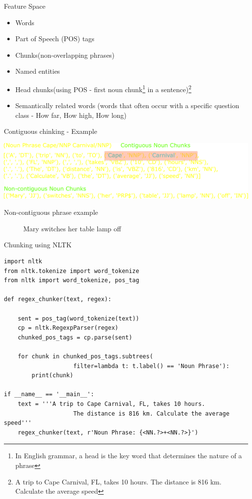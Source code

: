 \begin{frame}[fragile, shrink=10]{Feature Space}
    \begin{multicols}{2}
        \begin{itemize}
            \item Words
            \item Part of Speech (POS) tags
            \item Chunks(non-overlapping phrases)
            \item Named entities
            \item Head  chunks(using POS - first  noun  chunk\footnote{In English grammar, a head is the key word that determines the nature of a phrase}  in  a  sentence)\footnote{A trip to Cape Carnival, FL, takes 10 hours. The distance is 816 km. Calculate the average speed}
            \item Semantically  related  words (words  that often occur with a specific question class - How far, How high, How long)
        \end{itemize}
            \end{multicols}
            Contiguous chinking - Example
             \begin{center}
                \includegraphics[width=0.85\linewidth]{./Images/POS}
            \end{center}
            \begin{description}
                \item[Non-contiguous phrase example] Mary switches her table lamp off
            \end{description}
\end{frame}
\begin{frame}[fragile,shrink=9]{Chunking using NLTK}
\begin{lstlisting}
import nltk
from nltk.tokenize import word_tokenize
from nltk import word_tokenize, pos_tag

def regex_chunker(text, regex):

    sent = pos_tag(word_tokenize(text))
    cp = nltk.RegexpParser(regex)
    chunked_pos_tags = cp.parse(sent)

    for chunk in chunked_pos_tags.subtrees(
                    filter=lambda t: t.label() == 'Noun Phrase'):
        print(chunk)

if __name__ == '__main__':
    text = '''A trip to Cape Carnival, FL, takes 10 hours.
                    The distance is 816 km. Calculate the average speed'''
    regex_chunker(text, r'Noun Phrase: {<NN.?>+<NN.?>}')
\end{lstlisting}
\end{frame}

